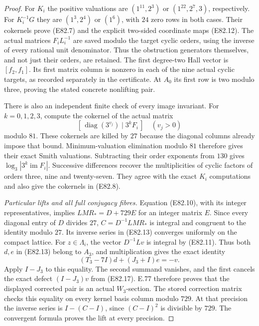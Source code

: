 \begin{proof}
For $K_i$ the positive valuations are $(1^{11},2^3)$
or $(1^{22},2^7,3)$, respectively. For $K_i^{-1}G$
they are $(1^3,2^4)$ or $(1^6)$, with $24$ zero rows
in both cases. Their cokernels prove (E82.7) and
the explicit two-sided coordinate maps (E82.12).
The actual matrices $F_iL_i^{-1}$ are saved modulo
the target cyclic orders, using the inverse of every
rational unit denominator. Thus the obstruction
generators themselves, and not just their orders,
are retained.
The first degree-two Hall vector is $[f_2,f_1]$.
Its first matrix column is nonzero in each of the nine
actual cyclic targets, as recorded separately in the
certificate. At $A_0$ its first row is two modulo
three, proving the stated concrete nonlifting pair.

There is also an independent finite check of every
image invariant. For $k=0,1,2,3$, compute the cokernel
of the actual matrix
\[
 [\,\operatorname{diag}(3^{v_j})\mid 3^kF_i\,]
              \quad(v_j>0)
 \tag{E82.19}
\]
modulo $81$. These cokernels are killed by $27$
because the diagonal columns already impose that
bound. Minimum-valuation elimination modulo $81$
therefore gives their exact Smith valuations.
Subtracting their order exponents from $130$ gives
$\log_3|3^k\operatorname{im}F_i|$.
Successive differences recover the multiplicities
of cyclic factors of orders three, nine and twenty-seven.
They agree with the exact $K_i$ computations and also
give the cokernels in (E82.8).

\emph{Particular lifts and all full conjugacy fibres.}
Equation (E82.10), with its integer representatives,
implies $LMR_*=D+729E$ for an integer matrix $E$.
Since every diagonal entry of $D$ divides $27$,
$C=D^{-1}LMR_*$ is integral and congruent to the
identity modulo $27$. Its inverse series in
(E82.13) converges uniformly on the compact lattice.
For $z\in\Lambda_i$, the vector $D^{-1}Lv$ is
integral by (E82.11). Thus both $d,e$ in (E82.13)
belong to $A_3$, and multiplication gives the exact
identity
\[
              (T_3-7I)d+(J_3+I)e=-v.
 \tag{E82.20}
\]
Apply $I-J_3$ to this equality. The second summand
vanishes, and the first cancels the exact defect
$(I-J_3)v$ from (E82.17). E.77 therefore proves
that the displayed corrected pair is an actual
$W_3$-section. The stored correction matrix checks
this equality on every kernel basis column modulo
$729$. At that precision the inverse series is
$I-(C-I)$, since $(C-I)^2$ is divisible by $729$.
The convergent formula proves the lift at every
precision.


\end{proof}

